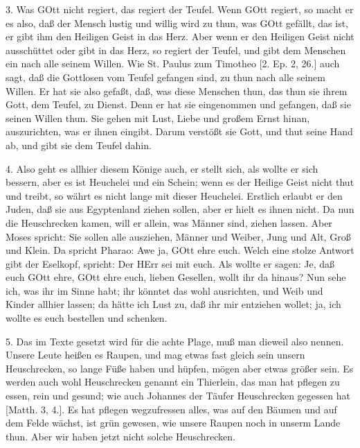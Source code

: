 3. Was GOtt nicht regiert, das regiert der Teufel. Wenn GOtt regiert, so macht er es also, daß der Mensch lustig und willig wird zu thun, was GOtt gefällt, das ist, er gibt ihm den Heiligen Geist in das Herz. Aber wenn er den Heiligen Geist nicht ausschüttet oder gibt in das Herz, so regiert der Teufel, und gibt dem Menschen ein nach alle seinem Willen. Wie St. Paulus zum Timotheo [2. Ep. 2, 26.] auch sagt, daß die Gottlosen vom Teufel gefangen sind, zu thun nach alle seinem Willen. Er hat sie also gefaßt, daß, was diese Menschen thun, das thun sie ihrem Gott, dem Teufel, zu Dienst. Denn er hat sie eingenommen und gefangen, daß sie seinen Willen thun. Sie gehen mit Lust, Liebe und großem Ernst hinan, auszurichten, was er ihnen eingibt. Darum verstößt sie Gott, und thut seine Hand ab, und gibt sie dem Teufel dahin.

4. Also geht es allhier diesem Könige auch, er stellt sich, als wollte er sich bessern, aber es ist Heuchelei und ein Schein; wenn es der Heilige Geist nicht thut und treibt, so währt es nicht lange mit dieser Heuchelei. Erstlich erlaubt er den Juden, daß sie aus Egyptenland ziehen sollen, aber er hielt es ihnen nicht. Da nun die Heuschrecken kamen, will er allein, was Männer sind, ziehen lassen. Aber Moses spricht: Sie sollen alle ausziehen, Männer und Weiber, Jung und Alt, Groß und Klein. Da spricht Pharao: Awe ja, GOtt ehre euch. Welch eine stolze Antwort gibt der Eselkopf, spricht: Der HErr sei mit euch. Als wollte er sagen: Je, daß euch GOtt ehre, GOtt ehre euch, lieben Gesellen, wollt ihr da hinaus? Nun sehe ich, was ihr im Sinne habt; ihr könntet das wohl ausrichten, und Weib und Kinder allhier lassen; da hätte ich Lust zu, daß ihr mir entziehen wollet; ja, ich wollte es euch bestellen und schenken.

5. Das im Texte gesetzt wird für die achte Plage, muß man dieweil also nennen. Unsere Leute heißen es Raupen, und mag etwas fast gleich sein unsern Heuschrecken, so lange Füße haben und hüpfen, mögen aber etwas größer sein. Es werden auch wohl Heuschrecken genannt ein Thierlein, das man hat pflegen zu essen, rein und gesund; wie auch Johannes der Täufer Heuschrecken gegessen hat [Matth. 3, 4.]. Es hat pflegen wegzufressen alles, was auf den Bäumen und auf dem Felde wächst, ist grün gewesen, wie unsere Raupen noch in unserm Lande thun. Aber wir haben jetzt nicht solche Heuschrecken.

